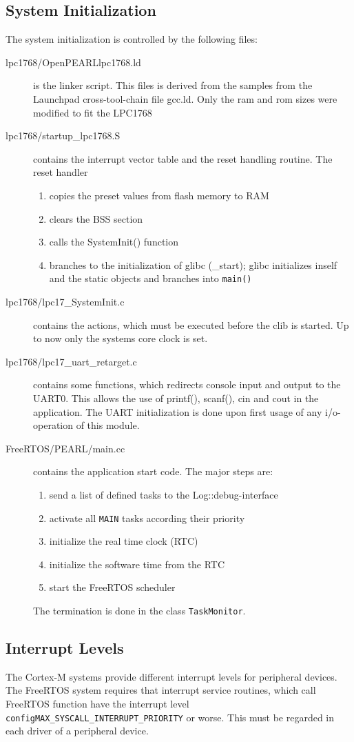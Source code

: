 \subsection{System Initialization}
The system initialization  is controlled by the following files:
\begin{description}
\item[lpc1768/OpenPEARLlpc1768.ld] is the linker script. 
   This files is derived from
   the samples from the Launchpad cross-tool-chain file gcc.ld. 
   Only the ram and rom sizes were modified to fit the LPC1768 
\item[lpc1768/startup\_lpc1768.S] contains the interrupt vector table and the 
   reset handling routine. The reset handler 
   \begin{enumerate}
   \item copies the preset values from flash memory to RAM
   \item clears the BSS section 
   \item  calls the SystemInit() function
   \item  branches to the initialization of glibc (\_start); glibc
      initializes inself and the static objects and branches into \verb|main()|
   \end{enumerate}
\item[lpc1768/lpc17\_SystemInit.c] contains the actions, which must be executed
   before the clib is started. Up to now only the systems core clock is 
   set.
\item [lpc1768/lpc17\_uart\_retarget.c] contains some functions, which redirects console 
   input and output to the UART0.  This allows the use of printf(), 
   scanf(), cin and cout in the application. The UART initialization is done 
   upon first usage of any i/o-operation of this module.
\item[FreeRTOS/PEARL/main.cc] contains the application start code.
 The major steps are:
  \begin{enumerate}
  \item send a list of defined tasks to the Log::debug-interface
  \item activate all \verb|MAIN| tasks according their priority
  \item initialize the real time clock (RTC)
  \item initialize the software time from the RTC
  \item start the FreeRTOS scheduler 
  \end{enumerate}
  The termination is done in the class \verb|TaskMonitor|. 
\end{description}

\subsection{Interrupt Levels}
The Cortex-M systems provide different interrupt levels for peripheral devices.
The FreeRTOS system requires that interrupt service routines, which call
FreeRTOS function have the interrupt level 
\texttt{configMAX\_SYSCALL\_INTERRUPT\_PRIORITY} or worse. 
This must be regarded in each driver of a peripheral device.



